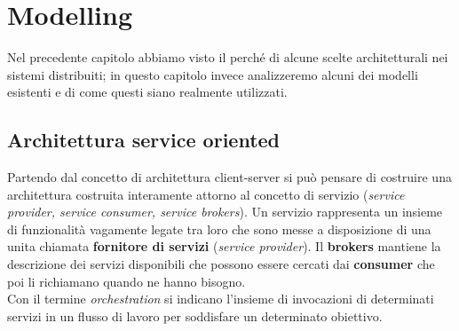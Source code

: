 \label{capitolo3}
\section{Modelling}
Nel precedente capitolo abbiamo visto il perché di alcune scelte architetturali nei sistemi distribuiti; in questo capitolo invece analizzeremo alcuni dei modelli esistenti e di come questi siano realmente utilizzati.
\subsection{Architettura service oriented}
Partendo dal concetto di architettura client-server si può pensare di costruire una architettura costruita interamente attorno al concetto di servizio (\emph{service provider, service consumer, service brokers}). Un servizio rappresenta un insieme di funzionalità vagamente legate tra loro che sono messe a disposizione di una unita chiamata \textbf{fornitore di servizi} (\emph{service provider}). Il \textbf{brokers} mantiene la descrizione dei servizi disponibili che possono essere cercati dai \textbf{consumer} che poi li richiamano quando ne hanno bisogno.\\
Con il termine \emph{orchestration} si indicano l'insieme di invocazioni di determinati servizi in un flusso di lavoro per soddisfare un determinato obiettivo.
